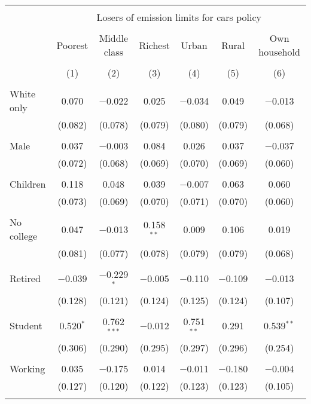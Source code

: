 
\begin{tabular}{@{\extracolsep{5pt}}lcccccc} 
\\[-1.8ex]\hline 
\hline \\[-1.8ex] 
 & \multicolumn{6}{c}{Losers of emission limits for cars policy} \\ 
\cline{2-7} 
\\[-1.8ex] & Poorest & Middle class & Richest & Urban & Rural & Own household \\ 
\\[-1.8ex] & (1) & (2) & (3) & (4) & (5) & (6)\\ 
\hline \\[-1.8ex] 
 White only & 0.070 & $-$0.022 & 0.025 & $-$0.034 & 0.049 & $-$0.013 \\ 
  & (0.082) & (0.078) & (0.079) & (0.080) & (0.079) & (0.068) \\ 
  & & & & & & \\ 
 Male & 0.037 & $-$0.003 & 0.084 & 0.026 & 0.037 & $-$0.037 \\ 
  & (0.072) & (0.068) & (0.069) & (0.070) & (0.069) & (0.060) \\ 
  & & & & & & \\ 
 Children & 0.118 & 0.048 & 0.039 & $-$0.007 & 0.063 & 0.060 \\ 
  & (0.073) & (0.069) & (0.070) & (0.071) & (0.070) & (0.060) \\ 
  & & & & & & \\ 
 No college & 0.047 & $-$0.013 & 0.158$^{**}$ & 0.009 & 0.106 & 0.019 \\ 
  & (0.081) & (0.077) & (0.078) & (0.079) & (0.079) & (0.068) \\ 
  & & & & & & \\ 
 Retired & $-$0.039 & $-$0.229$^{*}$ & $-$0.005 & $-$0.110 & $-$0.109 & $-$0.013 \\ 
  & (0.128) & (0.121) & (0.124) & (0.125) & (0.124) & (0.107) \\ 
  & & & & & & \\ 
 Student & 0.520$^{*}$ & 0.762$^{***}$ & $-$0.012 & 0.751$^{**}$ & 0.291 & 0.539$^{**}$ \\ 
  & (0.306) & (0.290) & (0.295) & (0.297) & (0.296) & (0.254) \\ 
  & & & & & & \\ 
 Working & 0.035 & $-$0.175 & 0.014 & $-$0.011 & $-$0.180 & $-$0.004 \\ 
  & (0.127) & (0.120) & (0.122) & (0.123) & (0.123) & (0.105) \\ 
  & & & & & & \\ 

\end{tabular}
